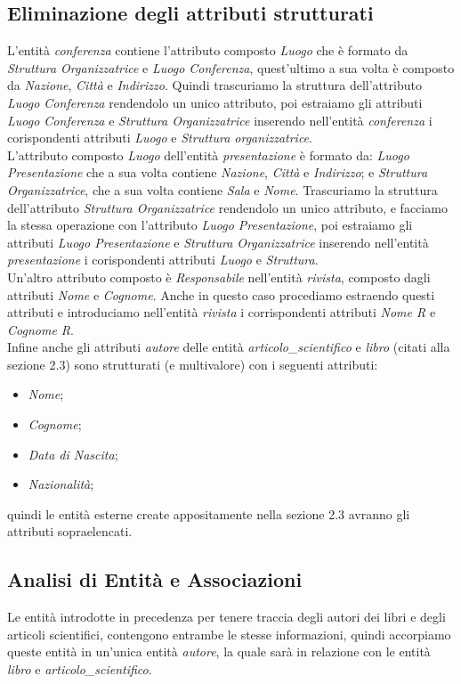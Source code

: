 \documentclass{article}
\begin{document}
\subsection{Eliminazione degli attributi strutturati}
L'entità \textit{conferenza} contiene l'attributo composto \textit{Luogo} che è formato da \textit{Struttura Organizzatrice} e \textit{Luogo Conferenza}, quest'ultimo a sua volta è composto da \textit{Nazione}, \textit{Città} e \textit{Indirizzo}. Quindi trascuriamo la struttura dell'attributo \textit{Luogo Conferenza} rendendolo un unico attributo, poi estraiamo gli attributi \textit{Luogo Conferenza} e \textit{Struttura Organizzatrice} inserendo nell'entità \textit{conferenza} i corispondenti attributi \textit{Luogo} e \textit{Struttura organizzatrice}.\\
L'attributo composto \textit{Luogo} dell'entità \textit{presentazione} è formato da: \textit{Luogo Presentazione} che a sua volta contiene \textit{Nazione}, \textit{Città} e \textit{Indirizzo}; e \textit{Struttura Organizzatrice}, che a sua volta contiene \textit{Sala} e \textit{Nome}. Trascuriamo la struttura dell'attributo \textit{Struttura Organizzatrice} rendendolo un unico attributo, e facciamo la stessa operazione con l'attributo  \textit{Luogo Presentazione}, poi  estraiamo gli attributi  \textit{Luogo Presentazione} e \textit{Struttura Organizzatrice} inserendo nell'entità \textit{presentazione} i corispondenti attributi \textit{Luogo} e \textit{Struttura}.\\
Un'altro attributo composto è \textit{Responsabile} nell'entità \textit{rivista}, composto dagli attributi \textit{Nome} e \textit{Cognome}. Anche in questo caso procediamo estraendo questi attributi e introduciamo nell'entità \textit{rivista} i corrispondenti attributi \textit{Nome R} e \textit{Cognome R}.\\
Infine anche gli attributi \textit{autore} delle entità \textit{articolo\_scientifico} e \textit{libro} (citati alla sezione 2.3) sono strutturati (e multivalore) con i seguenti attributi: \begin{itemize} 
\item \textit{Nome}; 
\item \textit{Cognome};
\item \textit{Data di Nascita};
\item \textit{Nazionalità};
\end{itemize}
quindi le entità esterne create appositamente nella sezione 2.3 avranno gli attributi sopraelencati.

\subsection{Analisi di Entità e Associazioni}
Le entità introdotte in precedenza per tenere traccia degli autori dei libri e degli articoli scientifici, contengono entrambe le stesse informazioni, quindi accorpiamo queste entità in un'unica entità \textit{autore}, la quale sarà in relazione con le entità \textit{libro} e \textit{articolo\_scientifico}.
\end{document}
